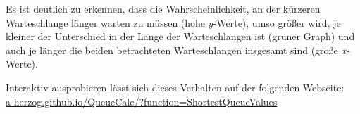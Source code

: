 \documentclass[a4paper,11pt,oneside]{article}
\begin{document}
Es ist deutlich zu erkennen, dass die Wahrscheinlichkeit, an der kürzeren Warteschlange länger warten zu müssen (hohe $y$-Werte), umso größer wird, je kleiner der Unterschied in der Länge der Warteschlangen ist (grüner Graph) und auch je länger die beiden betrachteten Warteschlangen insgesamt sind (große $x$-Werte).

Interaktiv ausprobieren lässt sich dieses Verhalten auf der folgenden Webseite:\\
\href{https://a-herzog.github.io/QueueCalc/?function=ShortestQueueValues}{a-herzog.github.io/QueueCalc/?function=ShortestQueueValues}
\end{document}
